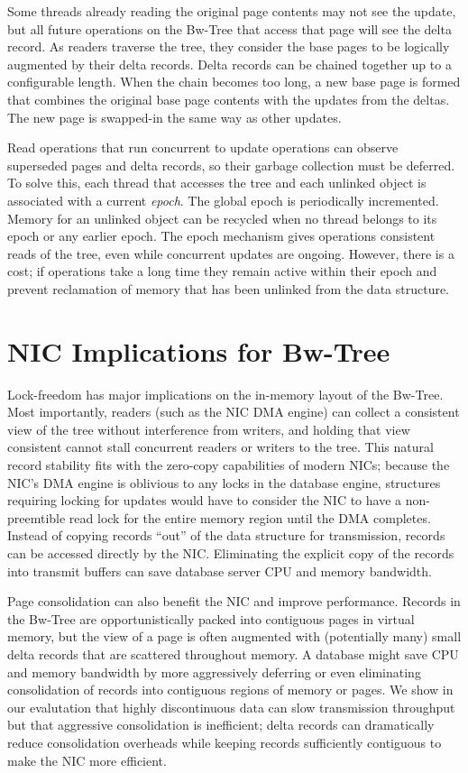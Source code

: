 Some threads already reading the original page contents may not see
the update, but all future operations on the Bw-Tree that access that page
will see the delta record. As readers traverse the tree, they consider
the base pages to be logically augmented by their delta records. Delta records
can be chained together up to a configurable length.  When the chain becomes
too long, a new base page is formed that combines the original base page
contents with the updates from the deltas. The new page is swapped-in
the same way as other updates.

Read operations that run concurrent to update operations can observe superseded
pages and delta records, so their garbage collection must be deferred.
To solve this, each thread that
accesses the tree and each unlinked object is associated with a current {\em epoch}.
The global epoch is periodically incremented. Memory for an unlinked object can be
recycled when no thread belongs to its epoch or any earlier epoch.
The epoch mechanism gives operations consistent reads of the
tree, even while concurrent updates are ongoing. However, there is a
cost; if operations take a long time they remain active within their epoch and
prevent reclamation of memory that has been unlinked from the data structure.

\section{NIC Implications for Bw-Tree}

Lock-freedom has major implications on the in-memory layout of the
Bw-Tree. Most importantly, readers (such as the NIC DMA engine) can collect a
consistent view of the tree without interference from writers, and holding that
view consistent cannot stall concurrent readers or writers to the tree.  This
natural record stability fits with the zero-copy capabilities of modern NICs;
because the NIC's DMA engine is oblivious to any locks in the database engine,
structures requiring locking for updates would have to consider the NIC to
have a non-preemtible read lock for the entire memory region until the DMA completes.
Instead of copying records ``out'' of the data structure for transmission,
records can be accessed directly by the NIC. Eliminating the explicit copy of
the records into transmit buffers can save database server CPU and memory
bandwidth.

Page consolidation can also benefit the NIC and improve performance.  Records
in the Bw-Tree are opportunistically packed into contiguous pages in virtual
memory, but the view of a page is often augmented with (potentially many)
small delta
records that are scattered throughout memory.
A database might save CPU and memory bandwidth by more
aggressively deferring or even eliminating consolidation of records into
contiguous regions of memory or pages. We show in
our evalutation that highly discontinuous data can slow
transmission throughput but that aggressive consolidation is inefficient; delta
records can dramatically reduce consolidation overheads while keeping records
sufficiently contiguous to make the NIC more efficient.

